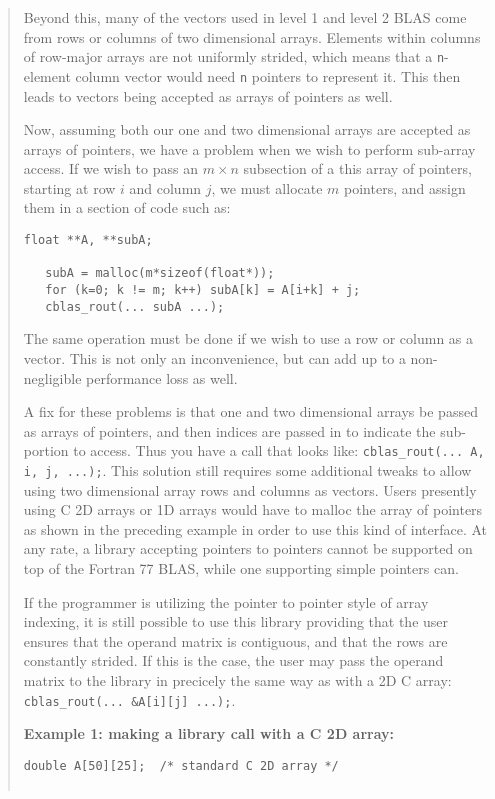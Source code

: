 \documentclass{article}
\begin{document}
{\begin{quotation}
Beyond this, many of the vectors used in level 1 and level 2 BLAS come
from rows or columns of two dimensional arrays.  Elements within columns of
row-major arrays are not uniformly strided, which means that a {\tt n}-element
column vector would need {\tt n} pointers to represent it.  This then
leads to vectors being accepted as arrays of pointers as well.

Now, assuming both our one and two dimensional arrays are accepted as arrays
of pointers,
we have a problem when we wish to perform sub-array access.  If we wish to
pass an $m \times n$ subsection of a this array of pointers, starting at row $i$
and column $j$,
we must allocate $m$ pointers, and assign them in a section of code such as:

\begin{Verbatim}[fontsize=\small,fontfamily=tt,fontshape=rm]
   float **A, **subA;

   subA = malloc(m*sizeof(float*));
   for (k=0; k != m; k++) subA[k] = A[i+k] + j;
   cblas_rout(... subA ...);
\end{Verbatim}

The same operation must be done if we wish to use a row or column as a vector.
This is not only an inconvenience, but can add up to a non-negligible
performance loss as well.

A fix for these problems is that one and two dimensional arrays be passed
as arrays of
pointers, and then indices are passed in to indicate the sub-portion to
access.  Thus you have a call that looks like:
\verb|cblas_rout(... A, i, j, ...);|.
This solution still requires some additional tweaks to allow using two 
dimensional array rows and columns as vectors.  Users presently using
C 2D arrays or 1D arrays would have to malloc the array of pointers as shown
in the preceding example in order to use this kind of interface.  At any
rate, a library accepting pointers to pointers cannot be supported on top
of the Fortran 77 BLAS, while one supporting simple pointers can.

If the programmer is utilizing the pointer to pointer style of array indexing,
it is still possible to use this library providing that the user ensures that
the operand matrix is contiguous, and that the rows are constantly
strided.  If this is the case, the user may pass the operand matrix
to the library in precicely the same way as with a 2D C array:
\verb|cblas_rout(... &A[i][j] ...);|.

\noindent
{\bf Example 1: making a library call with a C 2D array:}
\begin{Verbatim}[fontsize=\small,fontfamily=tt,fontshape=rm]
   double A[50][25];  /* standard C 2D array */


\end{Verbatim}
\end{quotation}}
\end{document}
